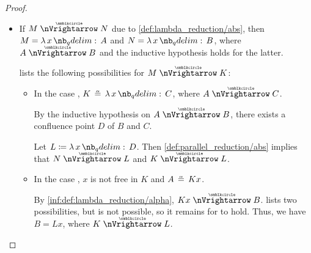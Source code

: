 \begin{proof}
\begin{itemize}
\begin{itemize}
\begin{itemize}
\begin{itemize}
          So \( L \) is the desired confluence point.

          \item In the case , \( x \) is not free in \( P \) and \( F \aequiv Px \).

          Let \( L \coloneqq PR \). Then
          and
          \begin{equation*}
            N
            =
            CD
            \ppred
            PR
            =
            L
          \end{equation*}
          and
          \begin{equation*}
            K
            \aequiv
            F[x \mapsto G]
            \reloset {\ref{thm:substitution_on_alpha_equivalent_terms}} \aequiv
            P[x \mapsto G] \thinspace G
            \reloset {\ref{thm:lambda_substitution_noop}} =
            PG
            \ppred
            PR
            =
            L.
          \end{equation*}
        \end{itemize}
      \end{itemize}
    \end{itemize}

    \item If \( M \ppred N \) due to \ref{def:lambda_reduction/abs}, then \( M = \qabs x A \) and \( N = \qabs x B \), where \( A \ppred B \) and the inductive hypothesis holds for the latter.

     lists the following possibilities for \( M \ppred K \):
    \begin{itemize}
      \item In the case , \( K \aequiv \qabs x C \), where \( A \ppred C \).

      By the inductive hypothesis on \( A \ppred B \), there exists a confluence point \( D \) of \( B \) and \( C \).

      Let \( L \coloneqq \qabs x D \). Then \ref{def:parallel_reduction/abs} implies that \( N \ppred L \) and \( K \ppred L \).

      \item In the case , \( x \) is not free in \( K \) and \( A \aequiv Kx \).

      By \ref{inf:def:lambda_reduction/alpha}, \( Kx \ppred B \).  lists two possibilities, but  is not possible, so it remains for  to hold. Thus, we have \( B = Lx \), where \( K \ppred L \).


\end{itemize}
\end{itemize}
\end{proof}
